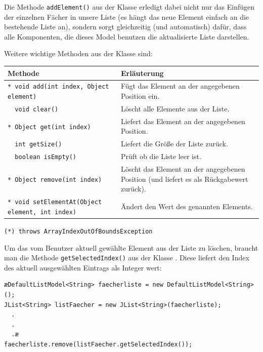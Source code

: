 Die Methode \lstinline|addElement()| aus der Klasse 
erledigt dabei nicht nur das Einfügen der einzelnen Fächer in unsere Liste (es
hängt das neue Element einfach an die bestehende Liste an), sondern sorgt
gleichzeitig (und automatisch) dafür, dass alle Komponenten, die dieses Model
benutzen die aktualisierte Liste darstellen.

Weitere wichtige Methoden aus der Klasse  sind:

\bgroup
\def\arraystretch{1.2}
\begin{tabularx}{\textwidth}{|p{85mm}|X|}
\hline
\textbf{Methode} & \textbf{Erläuterung}
\\ \hline
\lstinline|* void add(int index, Object element)| & 
Fügt das Element an der angegebenen Position ein.
\\ \hline
\lstinline|  void clear()| &
Löscht alle Elemente aus der Liste.
\\ \hline
\lstinline|* Object get(int index)| &
Liefert das Element an der angegebenen Position.
\\ \hline
\lstinline|  int getSize()| &
Liefert die Größe der Liste zurück.
\\ \hline
\lstinline|  boolean isEmpty()| &
Prüft ob die Liste leer ist.
\\ \hline
\lstinline|* Object remove(int index)| & 
Löscht das Element an der angegebenen Position (und liefert es als Rückgabewert
zurück). 
\\ \hline
\lstinline|* void setElementAt(Object element, int index)| & 
Ändert den Wert des genannten Elements. 
\\ \hline
\end{tabularx}
\egroup

\lstinline|(*) throws ArrayIndexOutOfBoundsException| 


Um das vom Benutzer aktuell gewählte Element aus der Liste zu löschen,
braucht man die Methode \linebreak
\lstinline|getSelectedIndex()| aus der Klasse . Diese liefert den
Index des aktuell ausgewählten Eintrags als Integer wert:

\begin{lstlisting}
æDefaultListModel<String> faecherliste = new DefaultListModel<String>();
JList<String> listFaecher = new JList<String>(faecherliste);
  .
  .
  .æ
faecherliste.remove(listFaecher.getSelectedIndex());
\end{lstlisting}


\subsection{}

